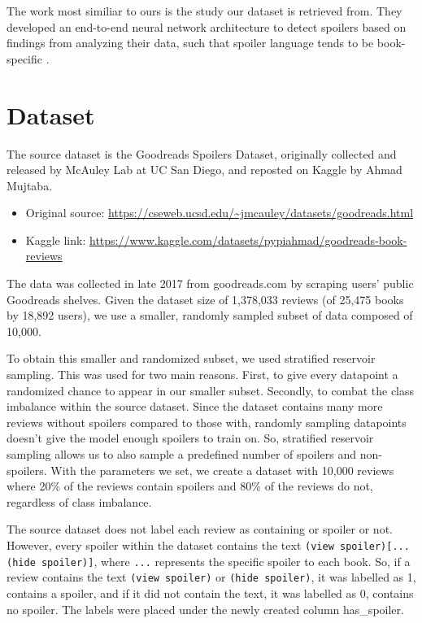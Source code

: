 \documentclass[11pt]{article}
\begin{document}
The work most similiar to ours is the study our dataset is retrieved from. They developed an end-to-end neural network architecture to detect spoilers based on findings from analyzing their data, such that spoiler language tends to be book-specific \cite{wan-etal-2019-fine}. 

\section{Dataset}

The source dataset is the Goodreads Spoilers Dataset, originally collected and released by McAuley Lab at UC San Diego, and reposted on Kaggle by Ahmad Mujtaba.
\begin{itemize}
  \item Original source: \url{https://cseweb.ucsd.edu/~jmcauley/datasets/goodreads.html}
  \item Kaggle link: \url{https://www.kaggle.com/datasets/pypiahmad/goodreads-book-reviews}
\end{itemize}
The data was collected in late 2017 from goodreads.com by scraping users' public Goodreads shelves. Given the dataset size of 1,378,033 reviews (of 25,475 books by 18,892 users), we use a smaller, randomly sampled subset of data composed of 10,000.
 
To obtain this smaller and randomized subset, we used stratified reservoir sampling. This was used for two main reasons. First, to give every datapoint a randomized chance to appear in our smaller subset. Secondly, to combat the class imbalance within the source dataset. Since the dataset contains many more reviews without spoilers compared to those with, randomly sampling datapoints doesn't give the model enough spoilers to train on. So, stratified reservoir sampling allows us to also sample a predefined number of spoilers and non-spoilers. With the parameters we set, we create a dataset with 10,000 reviews where 20\% of the reviews contain spoilers and 80\% of the reviews do not, regardless of class imbalance.
 
The source dataset does not label each review as containing or spoiler or not. However, every spoiler within the dataset contains the text \texttt{(view spoiler)[...(hide spoiler)]}, where \texttt{...} represents the specific spoiler to each book. So, if a review contains the text \texttt{(view spoiler)} or \texttt{(hide spoiler)}, it was labelled as 1, contains a spoiler, and if it did not contain the text, it was labelled as 0, contains no spoiler. The labels were placed under the newly created column has\_spoiler.
 
\end{document}
